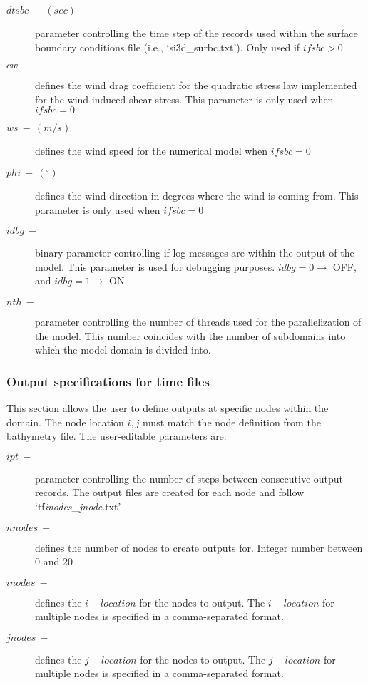 \begin{description}
    \item [$dtsbc\ -\ (sec)$] parameter controlling the time step of the records used within the surface boundary conditions file (i.e., `si3d\_surbc.txt'). Only used if $ifsbc > 0$
    \item [$cw\ -$] defines the wind drag coefficient for the quadratic stress law implemented for the wind-induced shear stress. This parameter is only used when $ifsbc = 0$
    \item [$ws\ -\ (m/s)$] defines the wind speed for the numerical model when $ifsbc = 0$
    \item [$phi\ -\ (^{\circ})$] defines the wind direction in degrees where the wind is coming from. This parameter is only used when $ifsbc = 0$
    \item [$idbg\ -$] binary parameter controlling if log messages are within the output of the model. This parameter is used for debugging purposes. $idbg = 0 \rightarrow$ OFF, and $idbg = 1 \rightarrow$ ON.
    \item [$nth\ -$] parameter controlling the number of threads used for the parallelization of the model. This number coincides with the number of subdomains into which the model domain is divided into.
\end{description}

\subsubsection{Output specifications for time files}
This section allows the user to define outputs at specific nodes within the domain. The node location $i,j$ must match the node definition from the bathymetry file. The user-editable parameters are:

\begin{description}
    \item [$ipt\ -$] parameter controlling the number of steps between consecutive output records. The output files are created for each node and follow `tf\textit{inodes}\_\textit{jnode}.txt'
    \item [$nnodes\ -$] defines the number of nodes to create outputs for. Integer number between 0 and 20
    \item [$inodes\ -$] defines the $i-location$ for the nodes to output. The $i-location$ for multiple nodes is specified in a comma-separated format.
    \item [$jnodes\ -$] defines the $j-location$ for the nodes to output. The $j-location$ for multiple nodes is specified in a comma-separated format.
\end{description}

